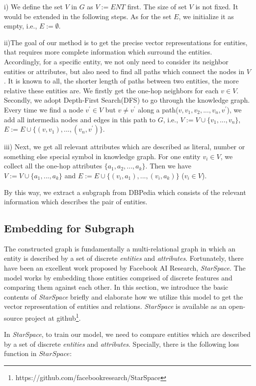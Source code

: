i) We define the set $V$ in $G$ as $V:=ENT$ first. 
The size of set $V$ is not fixed. It would be extended in the following steps.
As for the set $E$, we initialize it as empty, i.e., $E:=\emptyset$.

ii)The goal of our method is to get the precise vector representations for entities,
that requires more complete information which surround the entities.
Accordingly, for a specific entity, we not only need to consider its neighbor entities or attributes, but also
need to find all paths which connect the nodes in $V$. 
It is known to all, the shorter length of paths between two entities, the more relative these entities are.
We firstly get the one-hop neighbors for each $v \in V$. 
Secondly, we adopt Depth-First Search(DFS) to go through the knowledge graph. Every time we find a node
$v^{'} \in V$ but $v \ne v^{'}$ along a path($v, v_1, v_2,...,v_n, v^{'}$), we add all intermedia 
nodes and edges in this path to $G$, i.e., $V:=V \cup \{v_1, ..., v_n\}$, 
$E:=E \cup \{(v, v_1), ..., (v_n, v^{'})\}$.

iii) Next, we get all relevant attributes which are described as literal, number or something 
else special symbol in knowledge graph. For one entity $v_i \in V$, we collect all the one-hop attributes 
$\{a_1, a_2, ..., a_k\}$. Then we have $V:=V \cup \{a_1, ..., a_k\}$ and
$E:=E \cup \{(v_i, a_1), ..., (v_i, a_k)\}$ ($v_i \in V$).

By this way, we extract a subgraph from DBPedia which consists of the relevant information which describes
the pair of entities.

\subsection{Embedding for Subgraph}
\label{sec:train}
The constructed graph is fundamentally a multi-relational graph in which an entity is described by a set of discrete
\emph{entities} and \emph{attributes}. Fortunately, there have been an excellent work proposed by Facebook AI Research,
\emph{StarSpace}\cite{corr/Ledell17}. The model works by embedding those entities comprised of discrete features and
comparing them against each other. In this section, we introduce the basic contents of \emph{StarSpace} briefly and 
elaborate how we utilize this model to get the vector representation of entities and relations. \emph{StarSpace} is available as
an open-source project at github\footnote{https://github.com/facebookresearch/StarSpace}.

In \emph{StarSpace}, to train our model, we need to compare entities which are described by a set of discrete
\emph{entities} and \emph{attributes}. Specially, there is the following loss function in $StarSpace$:

